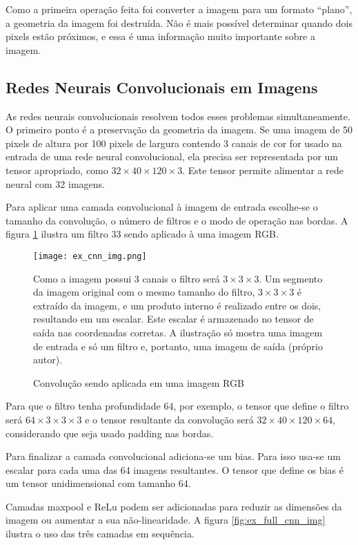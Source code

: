 Como a primeira operação feita foi converter a imagem para um formato “plano”, a
geometria da imagem foi destruída. Não é mais possível determinar quando dois
pixels estão próximos, e essa é uma informação muito importante sobre a imagem.

\subsection{Redes Neurais Convolucionais em Imagens}
As redes neurais convolucionais resolvem todos esses problemas simultaneamente.
O primeiro ponto é a preservação da geometria da imagem. Se uma imagem de 50
pixels de altura por 100 pixels de largura contendo 3 canais de cor for usado na
entrada de uma rede neural convolucional, ela precisa ser representada por um
tensor apropriado, como $32 \times 40 \times 120 \times 3$. Este tensor
permite alimentar a rede neural com 32 imagens.

Para aplicar uma camada convolucional à imagem de entrada escolhe-se o tamanho
da convolução, o número de filtros e o modo de operação nas bordas. A figura
\ref{fig:ex_cnn_img} ilustra um filtro 33 sendo aplicado à uma imagem RGB.

\begin{figure}[!htb]
	\centering
	\texttt{[image: ex\_cnn\_img.png]}
	\caption{Convolução sendo aplicada em uma imagem RGB}
	\label{fig:ex_cnn_img}
	Como a imagem possui 3 canais o filtro será $3 \times 3 \times 3$.
	Um segmento da imagem original com o mesmo tamanho do filtro,
	$3 \times 3 \times 3$ é extraído da imagem, e um
	produto interno é realizado entre os dois, resultando em um escalar. Este
	escalar é armazenado no tensor de saída nas coordenadas corretas. A
	ilustração só mostra uma imagem de entrada e só um filtro e, portanto, uma
	imagem de saída (próprio autor).
\end{figure}

Para que o filtro tenha profundidade 64, por exemplo, o tensor que define o
filtro será $64 \times 3 \times 3 \times 3$ e o tensor resultante da
convolução será $32 \times 40 \times 120 \times 64$,
considerando que seja usado padding nas bordas.

Para finalizar a camada convolucional adiciona-se um bias. Para isso usa-se um
escalar para cada uma das 64 imagens resultantes. O tensor que define os bias é
um tensor unidimensional com tamanho 64.

Camadas maxpool e ReLu podem ser adicionadas para reduzir as dimensões da imagem
ou aumentar a sua não-linearidade. A figura \ref{fig:ex_full_cnn_img}
ilustra o uso das três camadas em sequência.

